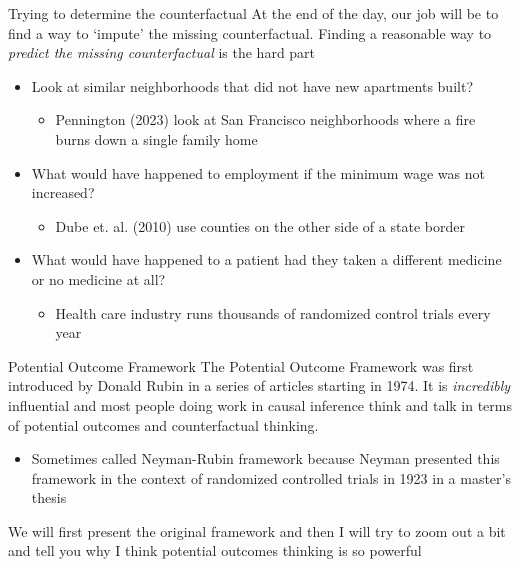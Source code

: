 \documentclass[aspectratio=169,t,11pt,table]{beamer}
\begin{document}
\begin{frame}{Trying to determine the counterfactual}
  At the end of the day, our job will be to find a way to `impute' the missing counterfactual. Finding a reasonable way to \emph{predict the missing counterfactual} is the hard part

  \bigskip
  \begin{itemize}
    \item Look at similar neighborhoods that did not have new apartments  built? 
    \begin{itemize}
      \item Pennington (2023) look at San Francisco neighborhoods where a fire burns down a single family home
    \end{itemize}
    
    \pause
    \item What would have happened to employment if the minimum wage was not increased? 

    \begin{itemize}
      \item Dube et. al. (2010) use counties on the other side of a state border
    \end{itemize}
    
    \pause
    \item What would have happened to a patient had they taken a different medicine or no medicine at all?
    \begin{itemize}
      \item Health care industry runs thousands of randomized control trials every year
    \end{itemize} 
  \end{itemize}
\end{frame}

\begin{frame}{Potential Outcome Framework}
  The \alert{Potential Outcome Framework} was first introduced by Donald Rubin in a series of articles starting in 1974. It is \emph{incredibly} influential and most people doing work in causal inference think and talk in terms of potential outcomes and counterfactual thinking.
  \begin{itemize}
    \item Sometimes called Neyman-Rubin framework because Neyman presented this framework in the context of randomized controlled trials in 1923 in a master's thesis
  \end{itemize}

  \pause
  \bigskip
  We will first present the original framework and then I will try to zoom out a bit and tell you why I think potential outcomes thinking is so powerful
\end{frame}
\end{document}
